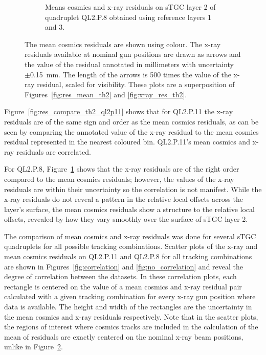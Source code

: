 \begin{figure}
\begin{subfigure}{\textwidth}
  \caption{Means cosmics and x-ray residuals on sTGC layer 2 of quadruplet QL2.P.8 obtained using reference layers 1 and 3.}
  \label{fig:res_compare_th2_ql2p8}
\end{subfigure}
\caption{The mean cosmics residuals are shown using colour. The x-ray residuals available at nominal gun positions are drawn as arrows and the value of the residual annotated in millimeters with uncertainty $\pm$\SI{0.15}{mm}. The length of the arrows is 500 times the value of the x-ray residual, scaled for visibility. These plots are a superposition of Figures~\ref{fig:res_mean_th2} and \ref{fig:xray_res_th2}.}
\label{fig:res_compare_th2}
\end{figure}
\newpage
\restoregeometry

Figure~\ref{fig:res_compare_th2_ql2p11} shows that for QL2.P.11 the x-ray residuals are of the same sign and order as the mean cosmics residuals, as can be seen by comparing the annotated value of the x-ray residual to the mean cosmics residual represented in the nearest coloured bin. QL2.P.11's mean cosmics and x-ray residuals are correlated. 

For QL2.P.8, Figure~\ref{fig:res_compare_th2_ql2p8} shows that the x-ray residuals are of the right order compared to the mean cosmics residuals; however, the values of the x-ray residuals are within their uncertainty so the correlation is not manifest. While the x-ray residuals do not reveal a pattern in the relative local offsets across the layer's surface, the mean cosmics residuals show a structure to the relative local offsets, revealed by how they vary smoothly over the surface of sTGC layer 2. 

The comparison of mean cosmics and x-ray residuals was done for several sTGC quadruplets for all possible tracking combinations. Scatter plots of the x-ray and mean cosmics residuals on QL2.P.11 and QL2.P.8 for all tracking combinations are shown in Figures~\ref{fig:correlation} and \ref{fig:no_correlation} and reveal the degree of correlation between the datasets. In these correlation plots, each rectangle is centered on the value of a mean cosmics and x-ray residual pair calculated with a given tracking combination for every x-ray gun position where data is available. The height and width of the rectangles are the uncertainty in the mean cosmics and x-ray residuals respectively. Note that in the scatter plots, the regions of interest where cosmics tracks are included in the calculation of the mean of residuals are exactly centered on the nominal x-ray beam positions, unlike in Figure~\ref{fig:res_compare_th2}.

